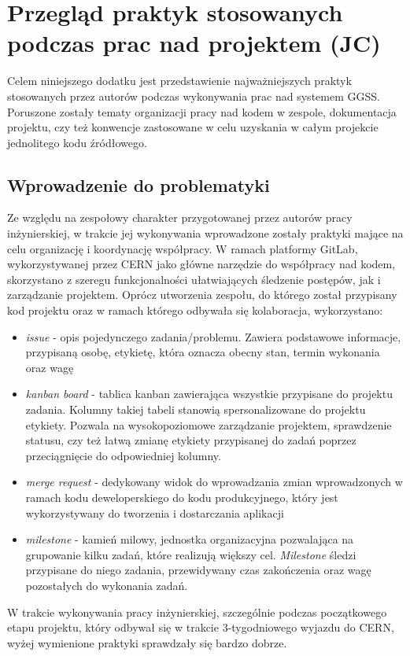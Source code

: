 \appendix
\chapter{Przegląd praktyk stosowanych podczas prac nad projektem (JC)}
\label{cha:practices}

Celem niniejszego dodatku jest przedstawienie najważniejszych praktyk stosowanych przez autorów podczas wykonywania prac nad systemem GGSS. Poruszone zostały tematy organizacji pracy nad kodem w zespole, dokumentacja projektu, czy też konwencje zastosowane w celu uzyskania w całym projekcie jednolitego kodu źródłowego.

\section{Wprowadzenie do problematyki}
Ze względu na zespołowy charakter przygotowanej przez autorów pracy inżynierskiej, w trakcie jej wykonywania wprowadzone zostały praktyki mające na celu organizację i koordynację współpracy. W ramach platformy GitLab, wykorzystywanej przez CERN jako główne narzędzie do współpracy nad kodem, skorzystano z szeregu funkcjonalności ułatwiających śledzenie postępów, jak i zarządzanie projektem. Oprócz utworzenia zespołu, do którego został przypisany kod projektu oraz w ramach którego odbywała się kolaboracja, wykorzystano:
\begin{itemize}
\item \emph{issue} - opis pojedynczego zadania/problemu. Zawiera podstawowe informacje, przypisaną osobę, etykietę, która oznacza obecny stan, termin wykonania oraz wagę
\item \emph{kanban board} - tablica kanban zawierająca wszystkie przypisane do projektu zadania. Kolumny takiej tabeli stanowią spersonalizowane do projektu etykiety. Pozwala na wysokopoziomowe zarządzanie projektem, sprawdzenie statusu, czy też łatwą zmianę etykiety przypisanej do zadań poprzez przeciągnięcie do odpowiedniej kolumny. %
\item \emph{merge request} - dedykowany widok do wprowadzania zmian wprowadzonych w ramach kodu deweloperskiego do kodu produkcyjnego, który jest wykorzystywany do tworzenia i dostarczania aplikacji
\item \emph{milestone} - kamień milowy, jednostka organizacyjna pozwalająca na grupowanie kilku zadań, które realizują większy cel. \emph{Milestone} śledzi przypisane do niego zadania, przewidywany czas zakończenia oraz wagę pozostałych do wykonania zadań.
\end{itemize}
W trakcie wykonywania pracy inżynierskiej, szczególnie podczas początkowego etapu projektu, który odbywał się w trakcie 3-tygodniowego wyjazdu do CERN, wyżej wymienione praktyki sprawdzały się bardzo dobrze.

